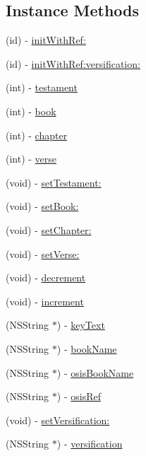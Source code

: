 \subsection*{Instance Methods}
\begin{DoxyCompactItemize}
\item 
(id) -\/ \hyperlink{interface_sword_verse_key_adad6312529c38c4b79f047d53db2b1ac}{init\-With\-Ref\-:}
\item 
(id) -\/ \hyperlink{interface_sword_verse_key_aaadf937711b8d0ce7541244bf01e532a}{init\-With\-Ref\-:versification\-:}
\item 
(int) -\/ \hyperlink{interface_sword_verse_key_a7c7cd672b32814a1786fe42fbc6c5017}{testament}
\item 
(int) -\/ \hyperlink{interface_sword_verse_key_aa4dcfb58d149016ecb37a96e7cee197b}{book}
\item 
(int) -\/ \hyperlink{interface_sword_verse_key_a561c6d4a29ed47ef25f03edfcdeb695f}{chapter}
\item 
(int) -\/ \hyperlink{interface_sword_verse_key_a6b2d405d250a46fef8499a441269ca84}{verse}
\item 
(void) -\/ \hyperlink{interface_sword_verse_key_a9787828f91acd630b6a256d7718af853}{set\-Testament\-:}
\item 
(void) -\/ \hyperlink{interface_sword_verse_key_af01662fcf1f8403cad61f49ba377f25b}{set\-Book\-:}
\item 
(void) -\/ \hyperlink{interface_sword_verse_key_a305c50be6e516b4b42064cab2b4d2b07}{set\-Chapter\-:}
\item 
(void) -\/ \hyperlink{interface_sword_verse_key_aaba0a72c059da0d1a05c295968a2fa1b}{set\-Verse\-:}
\item 
(void) -\/ \hyperlink{interface_sword_verse_key_af998f1201f6ff5160003144e5818b8ba}{decrement}
\item 
(void) -\/ \hyperlink{interface_sword_verse_key_aeb2624c7a86b765725fd80cd426e147d}{increment}
\item 
(N\-S\-String $\ast$) -\/ \hyperlink{interface_sword_verse_key_a44d51309effdaea4de23a8b6089b62a1}{key\-Text}
\item 
(N\-S\-String $\ast$) -\/ \hyperlink{interface_sword_verse_key_a0d8e5031e7b59c084e7d88a866b03fbc}{book\-Name}
\item 
(N\-S\-String $\ast$) -\/ \hyperlink{interface_sword_verse_key_acfe87e6aa5c2083dc8365cf54b9f91b1}{osis\-Book\-Name}
\item 
(N\-S\-String $\ast$) -\/ \hyperlink{interface_sword_verse_key_a39baef6096809ecdd9028466a64f965a}{osis\-Ref}
\item 
(void) -\/ \hyperlink{interface_sword_verse_key_ad5dcead96681e6c10eb1dc49a1ab789d}{set\-Versification\-:}
\item 
(N\-S\-String $\ast$) -\/ \hyperlink{interface_sword_verse_key_a63345e3292386bca3dea93ea966e577a}{versification}
\end{DoxyCompactItemize}
